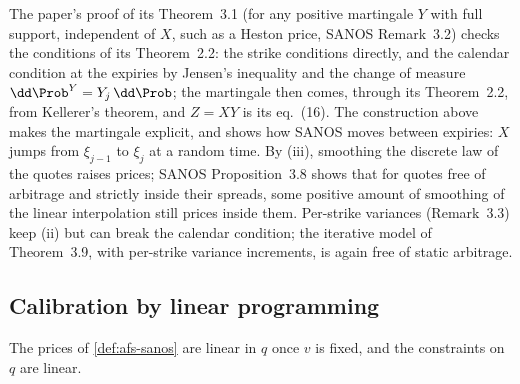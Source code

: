 The paper's proof of its Theorem~3.1 (for any positive martingale $Y$ with full support, independent of $X$, such
as a Heston price, SANOS Remark~3.2) checks the conditions of its Theorem~2.2: the strike conditions directly, and
the calendar condition at the expiries by Jensen's inequality and the change of measure $\dd\Prob^Y=Y_j\,\dd\Prob$;
the martingale then comes, through its Theorem~2.2, from Kellerer's theorem, and $Z=XY$ is its eq.~(16). The
construction above makes the martingale explicit, and shows how SANOS moves between expiries: $X$ jumps from
$\xi_{j-1}$ to $\xi_j$ at a random time. By (iii), smoothing the discrete law of the quotes raises prices; SANOS
Proposition~3.8 shows that for quotes free of arbitrage and strictly inside their spreads, some positive amount of
smoothing of the linear interpolation still prices inside them. Per-strike variances (Remark~3.3) keep (ii) but can
break the calendar condition; the iterative model of Theorem~3.9, with per-strike variance increments, is again free
of static arbitrage.

\subsection{Calibration by linear programming}\label{sec:afs-lp}

The prices of \cref{def:afs-sanos} are linear in $q$ once $v$ is fixed, and the constraints on $q$ are linear.


